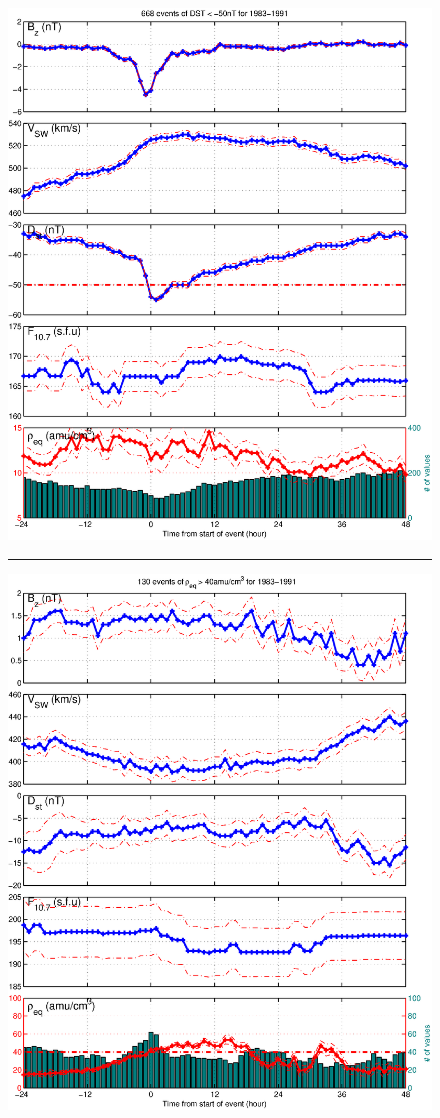 \documentclass[10pt,twocolumn]{article}
\begin{document}
\begin{figure}[htp!]
\centering
\includegraphics[scale=0.45]{paperfigures/stormavs-dst.eps}
\rule[1ex]{5cm}{0.5pt}
\includegraphics[scale=0.45]{paperfigures/stormavs-mass.eps}

\end{figure}
\end{document}
